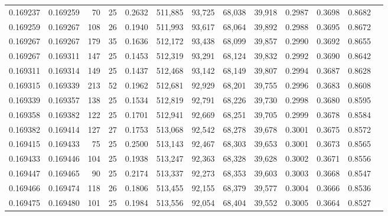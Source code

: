 \begin{tabular}{rrrrrrrrrrrrr}
0.169237 & 0.169259 &  70 &  25 &                                     0.2632 & 511,885 &  93,725 &  68,038 &  39,918 & 0.2987 & 0.3698 & 0.8682 \\
0.169259 & 0.169267 & 108 &  26 &                                     0.1940 & 511,993 &  93,617 &  68,064 &  39,892 & 0.2988 & 0.3695 & 0.8672 \\
0.169267 & 0.169267 & 179 &  35 &                                     0.1636 & 512,172 &  93,438 &  68,099 &  39,857 & 0.2990 & 0.3692 & 0.8655 \\
0.169267 & 0.169311 & 147 &  25 &                                     0.1453 & 512,319 &  93,291 &  68,124 &  39,832 & 0.2992 & 0.3690 & 0.8642 \\
0.169311 & 0.169314 & 149 &  25 &                                     0.1437 & 512,468 &  93,142 &  68,149 &  39,807 & 0.2994 & 0.3687 & 0.8628 \\
0.169315 & 0.169339 & 213 &  52 &                                     0.1962 & 512,681 &  92,929 &  68,201 &  39,755 & 0.2996 & 0.3683 & 0.8608 \\
0.169339 & 0.169357 & 138 &  25 &                                     0.1534 & 512,819 &  92,791 &  68,226 &  39,730 & 0.2998 & 0.3680 & 0.8595 \\
0.169358 & 0.169382 & 122 &  25 &                                     0.1701 & 512,941 &  92,669 &  68,251 &  39,705 & 0.2999 & 0.3678 & 0.8584 \\
0.169382 & 0.169414 & 127 &  27 &                                     0.1753 & 513,068 &  92,542 &  68,278 &  39,678 & 0.3001 & 0.3675 & 0.8572 \\
0.169415 & 0.169433 &  75 &  25 &                                     0.2500 & 513,143 &  92,467 &  68,303 &  39,653 & 0.3001 & 0.3673 & 0.8565 \\
0.169433 & 0.169446 & 104 &  25 &                                     0.1938 & 513,247 &  92,363 &  68,328 &  39,628 & 0.3002 & 0.3671 & 0.8556 \\
0.169447 & 0.169465 &  90 &  25 &                                     0.2174 & 513,337 &  92,273 &  68,353 &  39,603 & 0.3003 & 0.3668 & 0.8547 \\
0.169466 & 0.169474 & 118 &  26 &                                     0.1806 & 513,455 &  92,155 &  68,379 &  39,577 & 0.3004 & 0.3666 & 0.8536 \\
0.169475 & 0.169480 & 101 &  25 &                                     0.1984 & 513,556 &  92,054 &  68,404 &  39,552 & 0.3005 & 0.3664 & 0.8527 \\

\end{tabular}
